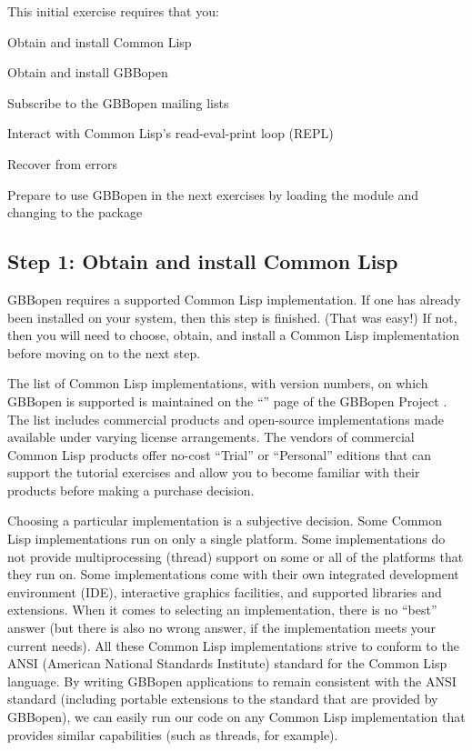 \documentclass[10pt,twoside,english,pdftex]{article}
\begin{document}
This initial exercise requires that you:
\begin{tightitemize}
\item Obtain and install Common Lisp
\item Obtain and install GBBopen
\item Subscribe to the GBBopen mailing lists
\item Interact with Common Lisp's read-eval-print loop (REPL)
\item Recover from errors
\item Prepare to use GBBopen in the next exercises by loading the
   module and changing to the 
  package
\end{tightitemize}

\fndocrule

\subsection*{Step 1: Obtain and install Common Lisp}

%
GBBopen requires a supported Common Lisp implementation.  If one has already
been installed on your system, then this step is finished.  (That was easy!)
If not, then you will need to choose, obtain, and install a Common Lisp
implementation before moving on to the next step.

The list of Common Lisp implementations, with version numbers, on which
GBBopen is supported is maintained on the ``'' page of the GBBopen Project
.  The list includes commercial
products and open-source implementations made available under varying license
arrangements.  The vendors of commercial Common Lisp products offer no-cost
``Trial'' or ``Personal'' editions that can support the tutorial exercises and
allow you to become familiar with their products before making a purchase
decision.

Choosing a particular implementation is a subjective decision.  Some Common
Lisp implementations run on only a single platform.  Some implementations do
not provide multiprocessing (thread) support on some or all of the platforms
that they run on.  Some implementations come with their own integrated
development environment (IDE), interactive graphics facilities, and supported
libraries and extensions.  When it comes to selecting an implementation, there
is no ``best'' answer (but there is also no wrong answer, if the
implementation meets your current needs).  All these Common Lisp
implementations strive to conform to the ANSI (American National Standards
Institute) standard for the Common Lisp language.  By writing GBBopen
applications to remain consistent with the ANSI standard (including portable
extensions to the standard that are provided by GBBopen), we can easily run
our code on any Common Lisp implementation that provides similar capabilities
(such as threads, for example).
\end{document}
